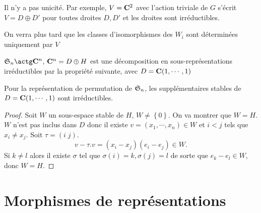 \begin{rem}
Il n'y a pas unicité. Par exemple, $V=\mathbf C^2$ avec l'action triviale de $G$ s'écrit  $V=D\oplus D'$ pour toutes droites  $D,D'$ et les droites sont irréductibles. 

On verra plus tard que les classes d'isomorphismes des $W_i$ sont déterminées uniquement par  $V$
\end{rem}

\begin{ex}
    $\gS_n\actg \C^n$, $\mathbf C^n=D\oplus H$ est une décomposition en sous-représentations irréductibles par la propriété suivante, avec $D=\mathbf C (1,\cdots ,1)$
\end{ex}

\begin{prop}
    Pour la représentation de permutation de $\mathfrak S_n$, les supplémentaires stables de  $D=\mathbf C(1,\cdots ,1)$ sont irréductibles.
\end{prop}

\begin{proof}
    Soit $W$ un sous-espace stable de  $H$,  $W\neq \left\{ 0 \right\} $. On va montrer que $W =H$.  $W$ n'est pas inclus dans  $D$ donc il existe  $v=(x_1,\cdots ,x_n) \in  W$ et $i<j$ tels que  $x_i\neq x_j$. Soit $\tau = (i\;j)$. \[v-\tau.v=(x_i-x_j)(e_i-e_j) \in  W.\] Si $k\neq l$ alors il existe  $\sigma$ tel que  $\sigma(i)=k, \sigma(j)=l$ de sorte que  $e_k-e_l \in  W$, donc $W=H$.
\end{proof}

\section{Morphismes de représentations}

